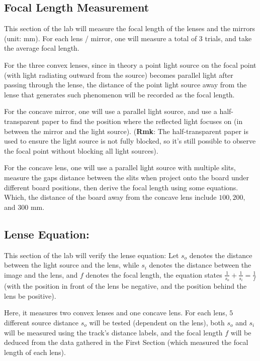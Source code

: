 \documentclass{article}
\begin{document}
\subsection{Focal Length Measurement}
This section of the lab will measure the focal length of the lenses and the mirrors (unit: mm). For each lens / mirror, one will measure a total of 3 trials, and take the average focal length.

For the three convex lenses, since in theory a point light source on the focal point (with light radiating outward from the source) becomes parallel light after passing through the lense, the distance of the point light source away from the lense that generates such phenomenon will be recorded as the focal length.

For the concave mirror, one will use a parallel light source, and use a half-transparent paper to find the position where the reflected light focuses on (in between the mirror and the light source). (\textbf{Rmk}: The half-transparent paper is used to ensure the light source is not fully blocked, so it's still possible to observe the focal point without blocking all light sources).

For the concave lens, one will use a parallel light source with multiple slits, measure the gaps distance between the slits when project onto the board under different board positions, then derive the focal length using some equations. Which, the distance of the board away from the concave lens include $100, 200,$ and $300$ mm.

\hfil

\subsection{Lense Equation:}
This section of the lab will verify the lense equation: Let $s_o$ denotes the distance between the light source and the lens, while $s_i$ denotes the distance between the image and the lens, and $f$ denotes the focal length, the equation states $\frac{1}{s_o}+\frac{1}{s_i}=\frac{1}{f}$ (with the position in front of the lens be negative, and the position behind the lens be positive).

Here, it measures two convex lenses and one concave lens. For each lens, $5$ different source distance $s_o$ will be tested (dependent on the lens), both $s_o$ and $s_i$ will be measured using the track's distance labels, and the focal length $f$ will be deduced from the data gathered in the First Section (which measured the focal length of each lens).
\end{document}

